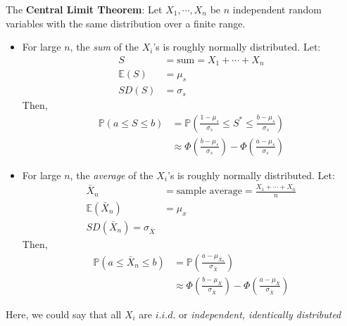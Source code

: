 \documentclass[titlepage, 12pt, leqno]{article}
\begin{document}
\begin{definition}
    The \textbf{Central Limit Theorem}: Let $X_1, \cdots , X_n$ be $n$ 
    independent random variables with the same distribution over a finite range.
    \begin{itemize}
        \item For large $n$, the \textit{sum} of the $X_i$'s is roughly 
            normally distributed.
                Let:
                \begin{align*}
                    S &= \text{sum} = X_1 + \cdots + X_n \\
                    \mathbb{E}(S) &= \mu_s \\
                    SD(S) &= \sigma_s
                \end{align*}
                Then,
                \begin{align*}
                    \mathbb{P}(a\le S \le b) &= \mathbb{P}\left(\frac{1-
                        \mu_s}{\sigma_s}\le
                        S^* \le \frac{b-\mu_s}{\sigma_s}\right) \\
                                             &\approx \Phi\left(\frac{b-
                                             \mu_s}{\sigma_s}\right) -
                                                \Phi\left(\frac{a-
                                                \mu_s}{\sigma_s}\right)
                \end{align*}
        \item For large $n$, the \textit{average} of the $X_i$'s is roughly
            normally distributed.
            Let:
           \begin{align*}
               \bar X_n &= \text{sample average} = \frac{X_1 + \cdots 
               + X_n}{n} \\
                   \mathbb{E}( \bar X_n) &= \mu_x \\
                   SD( \bar X_n) = \sigma_{ \bar X}
           \end{align*}
            Then,
           \begin{align*}
               \mathbb{P}(a \le \bar X_n \le b) &= \mathbb{P}\left(
                   \frac{a-\mu_{ \bar X_n}}{\sigma_{ \bar X}}\right) \\
                                                &\approx \Phi\left(
                                                    \frac{b-\mu_{ \bar
                                                    X}}{\sigma_{ \bar X}}\right) -
                                                    \Phi\left(
                                                    \frac{a-\mu_{ \bar
                                                    X}}{\sigma_{ \bar X}}\right)
           \end{align*}
    \end{itemize}
    \begin{note}
        Here, we could say that all $X_i$ are $i.i.d.$ or \textit{independent,
        identically distributed}
    \end{note}
\end{definition}
\end{document}
